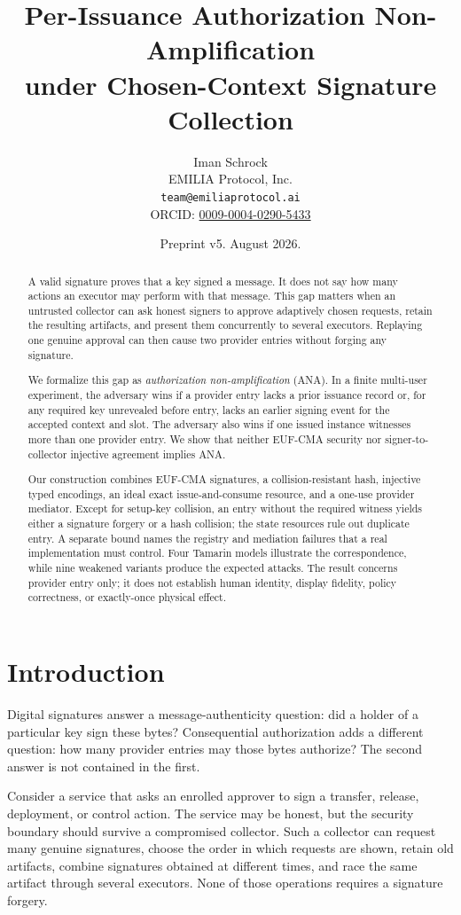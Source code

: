 \documentclass[10pt]{article}
\title{Per-Issuance Authorization Non-Amplification\\
under Chosen-Context Signature Collection}
\author{Iman Schrock\\
EMILIA Protocol, Inc.\\
\texttt{team@emiliaprotocol.ai}\\
ORCID: \href{https://orcid.org/0009-0004-0290-5433}{0009-0004-0290-5433}}
\date{Preprint v5. August 2026.}
\begin{document}
\maketitle

\begin{abstract}
A valid signature proves that a key signed a message. It does not say how many
actions an executor may perform with that message. This gap matters when an
untrusted collector can ask honest signers to approve adaptively chosen
requests, retain the resulting artifacts, and present them concurrently to
several executors. Replaying one genuine approval can then cause two provider
entries without forging any signature.

We formalize this gap as \emph{authorization non-amplification} (ANA). In a
finite multi-user experiment, the adversary wins if a provider entry lacks a
prior issuance record or, for any required key unrevealed before entry, lacks
an earlier signing event for the accepted context and slot. The adversary also
wins if one issued instance witnesses more than one provider entry. We show
that neither EUF-CMA security nor signer-to-collector injective agreement
implies ANA.

Our construction combines EUF-CMA signatures, a collision-resistant hash,
injective typed encodings, an ideal exact issue-and-consume resource, and a
one-use provider mediator. Except for setup-key collision, an entry without the
required witness yields either a signature forgery or a hash collision; the
state resources rule out duplicate entry. A separate bound names the registry
and mediation failures that a real implementation must control. Four Tamarin
models illustrate the correspondence, while nine weakened variants produce the
expected attacks. The result concerns provider entry only; it does not establish
human identity, display fidelity, policy correctness, or exactly-once physical
effect.
\end{abstract}

\section{Introduction}

Digital signatures answer a message-authenticity question: did a holder of a
particular key sign these bytes? Consequential authorization adds a different
question: how many provider entries may those bytes authorize? The second
answer is not contained in the first.

Consider a service that asks an enrolled approver to sign a transfer, release,
deployment, or control action. The service may be honest, but the security
boundary should survive a compromised collector. Such a collector can request
many genuine signatures, choose the order in which requests are shown, retain
old artifacts, combine signatures obtained at different times, and race the
same artifact through several executors. None of those operations requires a
signature forgery.
\end{document}
